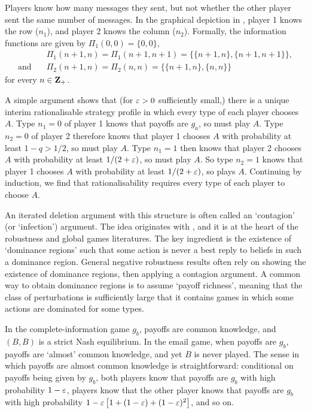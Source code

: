 \documentclass[11pt,letterpaper,reqno,oneside]{article}
\begin{document}
Players know how many messages they sent, but not whether the other player sent the same number of messages. In the graphical depiction in , player 1 knows the row ($n_1$), and player 2 knows the column ($n_2$). Formally, the information functions are given by $\Pi_1(0,0) = \{0,0\}$,
%
\begin{align*}
	&\Pi_1(n+1,n) = \Pi_1(n+1,n+1) = \{ \{n+1,n\}, \{n+1,n+1\} \} ,
	\\
	\text{and}\quad
	&\Pi_2(n+1,n) = \Pi_2(n,n) = \{ \{n+1,n\}, \{n,n\} \} 
\end{align*}
%
for every $n \in \mathbf{Z}_+$.

A simple argument shows that (for $\varepsilon>0$ sufficiently small,) there is a unique interim rationalisable strategy profile in which every type of each player chooses $A$. Type $n_1=0$ of player 1 knows that payoffs are $g_a$, so must play $A$. Type $n_2=0$ of player 2 therefore knows that player 1 chooses $A$ with probability at least $1-q>1/2$, so must play $A$. Type $n_1=1$ then knows that player 2 chooses $A$ with probability at least $1/(2+\varepsilon)$, so must play $A$. So type $n_2=1$ knows that player 1 chooses $A$ with probability at least $1/(2+\varepsilon)$, so plays $A$. Continuing by induction, we find that rationalisability requires every type of each player to choose $A$.

An iterated deletion argument with this structure is often called an `contagion' (or `infection') argument. The idea originates with \textcite{Rubinstein1989}, and it is at the heart of the robustness and global games literatures. The key ingredient is the existence of `dominance regions' such that some action is never a best reply to beliefs in such a dominance region. General negative robustness results often rely on showing the existence of dominance regions, then applying a contagion argument. A common way to obtain dominance regions is to assume `payoff richness', meaning that the class of perturbations is sufficiently large that it contains games in which some actions are dominated for some types.


In the complete-information game $g_b$, payoffs are common knowledge, and $(B,B)$ is a strict Nash equilibrium. In the email game, when payoffs are $g_b$, payoffs are `almost' common knowledge, and yet $B$ is never played. The sense in which payoffs are almost common knowledge is straightforward: conditional on payoffs being given by $g_b$, both players know that payoffs are $g_b$ with high probability $1-\varepsilon$, players know that the other player knows that payoffs are $g_b$ with high probability $1 - \varepsilon \left[ 1 + (1-\varepsilon) + (1-\varepsilon)^2 \right]$, and so on.
\end{document}
